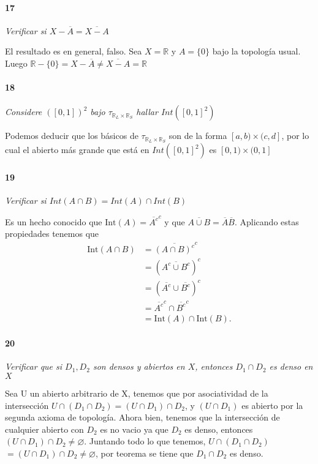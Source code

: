 \documentclass[12pt]{article}
\begin{document}
\paragraph{17}
\textit{Verificar si $X-\overline{A}=\overline{X-A}$}

El resultado es en general, falso. Sea $X=\mathbb{R}$ y $A=\{0\}$ bajo la topología usual.
 Luego $\mathbb{R}-\{0\} = X-\overline{A}\neq \overline{X-A} = \mathbb{R}$

\paragraph{18}
\textit{Considere $([0,1])^2$ bajo $\tau_{\mathbb{R}_L\times\mathbb{R}_S}$ hallar $Int([0,1]^2)$}

Podemos deducir que los b\'asicos de $\tau_{\mathbb{R}_L\times\mathbb{R}_S}$
son de la forma $[a, b) \times (c, d]$, por lo cual el abierto m\'as
grande que est\'a en $Int([0,1]^2)$ es $[0, 1) \times (0, 1]$

\paragraph{19}
\textit{Verificar si $Int(A\cap B)=Int(A)\cap Int(B)$}

Es un hecho conocido que $\text{Int}(A)=\overline{A^c}^c$ y que $\overline{A \cup B}=\overline{A} \overline{B}$. Aplicando estas propiedades tenemos que 
\begin{align*}
    \text{Int}(A \cap B) &=\overline{(A \cap B)^c}^c \\
                         &=(\overline{A^c \cup B^c})^c \\
                         &=(\overline{A^c} \cup \overline{B^c})^c \\
                         &=\overline{A^c}^c \cap \overline{B^c}^c \\
                         &=\text{Int}(A) \cap \text{Int}(B).
\end{align*}


\paragraph{20}
\textit{Verificar que si $D_{1}, D_{2}$ son densos y abiertos en $X$, entonces $D_{1} \cap D_{2}$ es denso en $X$}

Sea U un abierto arbitrario de X, tenemos que por
asociatividad de la intersecci\'on
$U \cap (D_{1} \cap D_{2}) = (U \cap D_{1}) \cap D_{2}$,
y $(U \cap D_{1})$ es abierto por la segunda axioma de
topolog\'ia. Ahora bien, tenemos que la intersecci\'on de
cualquier abierto con $D_{2}$ es no vacio ya que $D_{2}$ es
denso, entonces $(U \cap D_{1}) \cap D_{2} \neq \varnothing$.
Juntando todo lo que tenemos, $U \cap (D_{1} \cap D_{2})$
$= (U \cap D_{1}) \cap D_{2} \neq \varnothing$, por teorema
se tiene que $D_{1} \cap D_{2}$ es denso.
\end{document}
